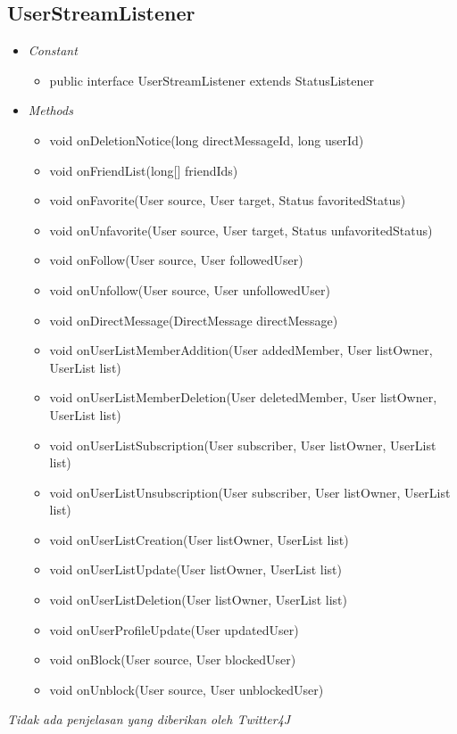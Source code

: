 	\subsection{UserStreamListener}
	\begin{itemize}
		\item \textit{Constant}
		
		\begin{itemize}
			\item public interface UserStreamListener
			extends StatusListener
		\end{itemize}
		\item \textit{Methods}
		
		\begin{itemize}
			\item void onDeletionNotice(long directMessageId, long userId)
			\item void onFriendList(long[] friendIds)
			\item void onFavorite(User source, User target, Status favoritedStatus)
			\item void onUnfavorite(User source, User target, Status unfavoritedStatus)
			\item void onFollow(User source, User followedUser)
			\item void onUnfollow(User source, User unfollowedUser)
			\item void onDirectMessage(DirectMessage directMessage)
			\item void onUserListMemberAddition(User addedMember, User listOwner, UserList list)
			\item void onUserListMemberDeletion(User deletedMember, User listOwner, UserList list)
			\item void onUserListSubscription(User subscriber, User listOwner, UserList list)
			\item void onUserListUnsubscription(User subscriber, User listOwner, UserList list)
			\item void onUserListCreation(User listOwner, UserList list)
			\item void onUserListUpdate(User listOwner, UserList list)
			\item void onUserListDeletion(User listOwner, UserList list)
			\item void onUserProfileUpdate(User updatedUser)
			\item void onBlock(User source, User blockedUser)
			\item void onUnblock(User source, User unblockedUser)
		\end{itemize}
	\end{itemize}
	\textit{Tidak ada penjelasan yang diberikan oleh Twitter4J}
	
